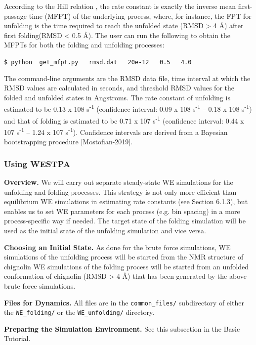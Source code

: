 \documentclass[9pt,tutorial,ASAPversion]{livecoms}
\begin{document}
According to the Hill relation \citep{Hill1989}, the rate constant is exactly the inverse mean first-passage time (MFPT) of the underlying process, where, for instance, the FPT for unfolding is the time required to reach the unfolded state (RMSD > 4 \AA) after first folding(RMSD < 0.5 \AA). 
The user can run the following to obtain the MFPTs for both the folding and unfolding processes: 

\verb|$ python  get_mfpt.py   rmsd.dat   20e-12   0.5   4.0|

The command-line arguments are the RMSD data file, time interval at which the RMSD values are calculated in seconds, and threshold RMSD values for the folded and unfolded states in Angstroms. 
The rate constant of unfolding is estimated to be 0.13 x 108 s\textsuperscript{-1} (confidence interval: 0.09 x 108 s\textsuperscript{-1} – 0.18 x 108 s\textsuperscript{-1}) and that of folding is estimated to be 0.71 x 107 s\textsuperscript{-1} (confidence interval: 0.44 x 107 s\textsuperscript{-1} – 1.24 x 107 s\textsuperscript{-1}). 
Confidence intervals are derived from a Bayesian bootstrapping procedure [Mostofian-2019]. 

\subsubsection{Using WESTPA}

\textbf{Overview.} We will carry out separate steady-state WE simulations for the unfolding and folding processes. 
This strategy is not only more efficient than equilibrium WE simulations in estimating rate constants (see Section 6.1.3), but enables us to set WE parameters for each process (e.g. bin spacing) in a more process-specific way if needed. 
The target state of the folding simulation will be used as the initial state of the unfolding simulation and vice versa. 

\textbf{Choosing an Initial State.} As done for the brute force simulations, WE simulations of the unfolding process will be started from the NMR structure of chignolin WE simulations of the folding process will be started from an unfolded conformation of chignolin (RMSD > 4 \AA) that has been generated by the above brute force simulations.
 
\textbf{Files for Dynamics.} All files are in the \verb|common_files/| subdirectory of either the \verb|WE_folding/| or the \verb|WE_unfolding/| directory.
 
\textbf{Preparing the Simulation Environment.} See this subsection in the Basic Tutorial.
 
\end{document}
